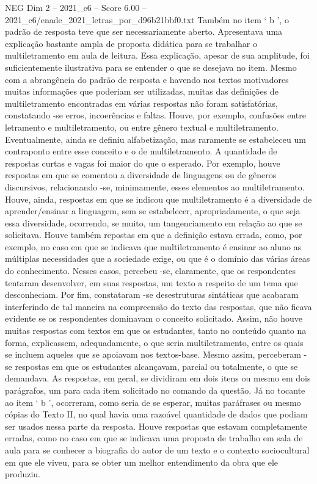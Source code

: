 \begin{textsample}{NEG Dim 2 – 2021\_c6 – Score 6.00 – 2021\_c6/enade\_2021\_letras\_por\_d96b21bbf0.txt}
Também no item ‘ b ’, o padrão de resposta teve que ser necessariamente aberto.
Apresentava uma explicação bastante ampla de proposta didática para se trabalhar o multiletramento em aula de leitura.
Essa explicação, apesar de sua amplitude, foi suficientemente ilustrativa para se entender o que se desejava no item.
Mesmo com a abrangência do padrão de resposta e havendo nos textos motivadores muitas informações que poderiam ser utilizadas, muitas das definições de multiletramento encontradas em várias respostas não foram satisfatórias, constatando -se erros, incoerências e faltas.
Houve, por exemplo, confusões entre letramento e multiletramento, ou entre gênero textual e multiletramento.
Eventualmente, ainda se definiu alfabetização, mas raramente se estabeleceu um contraponto entre esse conceito e o de multiletramento.
A quantidade de respostas curtas e vagas foi maior do que o esperado.
Por exemplo, houve respostas em que se comentou a diversidade de linguagens ou de gêneros discursivos, relacionando -se, minimamente, esses elementos ao multiletramento.
Houve, ainda, respostas em que se indicou que multiletramento é a diversidade de aprender/ensinar a linguagem, sem se estabelecer, apropriadamente, o que seja essa diversidade, ocorrendo, se muito, um tangenciamento em relação ao que se solicitava.
Houve também repostas em que a definição estava errada, como, por exemplo, no caso em que se indicava que multiletramento é ensinar ao aluno as múltiplas necessidades que a sociedade exige, ou que é o domínio das várias áreas do conhecimento.
Nesses casos, percebeu -se, claramente, que os respondentes tentaram desenvolver, em suas respostas, um texto a respeito de um tema que desconheciam.
Por fim, constataram -se desestruturas sintáticas que acabaram interferindo de tal maneira na compreensão do texto das respostas, que não ficava evidente se os respondentes dominavam o conceito solicitado.
Assim, não houve muitas respostas com textos em que os estudantes, tanto no conteúdo quanto na forma, explicassem, adequadamente, o que seria multiletramento, entre os quais se incluem aqueles que se apoiavam nos textos-base.
Mesmo assim, perceberam -se respostas em que os estudantes alcançavam, parcial ou totalmente, o que se demandava.
As respostas, em geral, se dividiram em dois itens ou mesmo em dois parágrafos, um para cada item solicitado no comando da questão.
Já no tocante ao item ‘ b ’, ocorreram, como seria de se esperar, muitas paráfrases ou mesmo cópias do Texto II, no qual havia uma razoável quantidade de dados que podiam ser usados nessa parte da resposta.
Houve respostas que estavam completamente erradas, como no caso em que se indicava uma proposta de trabalho em sala de aula para se conhecer a biografia do autor de um texto e o contexto sociocultural em que ele viveu, para se obter um melhor entendimento da obra que ele produziu.

\end{textsample}
